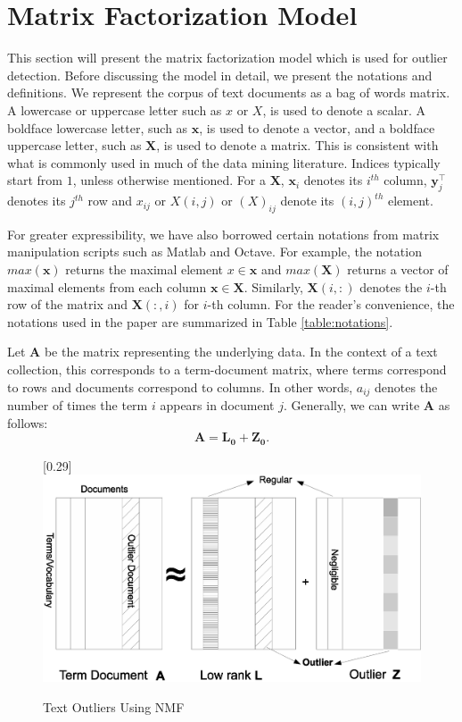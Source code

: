 \section{Matrix Factorization Model}
\label{sec:model} This section will  present the matrix
factorization model which is used for outlier detection. Before
discussing the model in detail, we present the notations and
definitions.  We represent the corpus of text documents as a bag of
words matrix.  A lowercase or uppercase letter such as $x$ or $X$,
is used to denote a scalar. A boldface lowercase letter, such as
$\mathbf{x}$, is used to denote a vector, and  a boldface uppercase
letter, such as $\mathbf{X}$, is used to denote a matrix. This is
consistent with what is commonly used in much of the data mining
literature. Indices typically start from $1$, unless otherwise
mentioned.  For a $\mathbf{X}$, $\mathbf{x}_{i}$ denotes its
$i^{th}$ column, $\mathbf{y}_j^\intercal$ denotes its $j^{th}$ row
and $x_{ij}$ or $X(i,j)$ or $(X)_{ij}$ denote its $(i,j)^{th}$
element.

For greater expressibility, we have also borrowed certain notations
from matrix manipulation scripts such as Matlab and Octave.  For
example, the notation $max(\mathbf{x})$ returns the maximal element
$x \in \mathbf{x}$ and $max(\mathbf{X})$ returns a vector of maximal
elements from each column $\mathbf{x} \in \mathbf{X}$. Similarly,
$\mathbf{X}(i,:)$ denotes the $i$-th row of the matrix and
$\mathbf{X}(:,i)$ for $i$-th column.  For the  reader's convenience,
the notations  used in the paper are summarized in  Table
\ref{table:notations}.

Let $\mathbf{A}$ be the matrix representing the underlying data. In
the context of a text collection, this corresponds to a
term-document matrix, where terms correspond to rows and documents
correspond to columns. In other words, $a_{ij}$ denotes the number
of times the term $i$ appears in document $j$.  Generally, we
can write $\mathbf{A}$ as follows:
\begin{equation}
\mathbf{A} = \mathbf{L_0} + \mathbf{Z_0}.
\end{equation}

\begin{figure}
\scalebox{0.34}[0.29]{\includegraphics{outlieroverview.eps}}
\caption{Text Outliers Using NMF} \label{fig:outlieroverview}
\end{figure}

